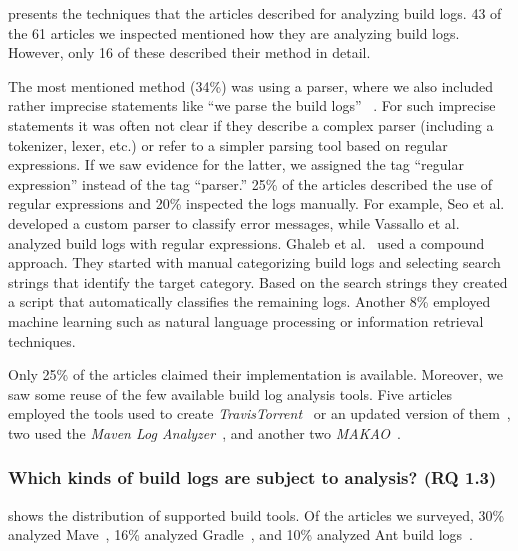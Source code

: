  presents the techniques that the articles
described for analyzing build logs.
43 of the 61 articles we inspected mentioned how they are analyzing
build logs.
However, only 16 of these described their method in detail.

The most mentioned method (34\%) was using a parser, where we also
included
rather imprecise statements like ``we parse the build logs''
~\cite{rahman2018impact}.
For such imprecise statements it was often not clear if they describe
a complex parser (including a tokenizer, lexer, etc.) or refer to a
simpler parsing tool based on regular expressions.
If we saw evidence for the latter, we assigned the tag
``regular expression'' instead of the tag ``parser.''
25\% of the articles described the use of regular expressions and 20\%
inspected the logs manually.
For example,
Seo et al.~\cite{seo2014programmers} developed a custom
parser to classify error messages, while Vassallo et
al.~\cite{vassallo2017a-tale} analyzed build logs with regular
expressions.
Ghaleb et al.~\cite{ghaleb2019studying} used a compound approach.
They started with manual categorizing build logs and selecting
search strings that identify the target category.
Based on the search strings they created a script that automatically
classifies the remaining logs.
Another 8\% employed machine learning such as natural language
processing or information retrieval techniques.


Only 25\% of the articles claimed their implementation is available.
Moreover, we
saw some reuse of the few available build log analysis tools.
Five articles employed the tools used to create
\emph{TravisTorrent}~\cite{beller2017travistorrent,beller2017oops,
orellana2017differences,zhao2018comparing} or
an updated version of them~\cite{rott2019empirische,
shi2018evaluating}, two used the
\emph{Maven Log Analyzer}~\cite{macho2018automatically,gallaba2018noise}, and
another two 
\emph{MAKAO}~\cite{wen2018blimp,adams2007design,adams2007makao}.

\subsubsection{Which kinds of build logs are subject to
  analysis? (RQ 1.3)}
 shows the distribution of supported
build tools.
Of the articles we surveyed, 30\% analyzed
Mave~\cite{maven2019website},
16\% analyzed Gradle~\cite{gradle2020website},
and 10\% analyzed Ant build logs~\cite{ant2020website}.

